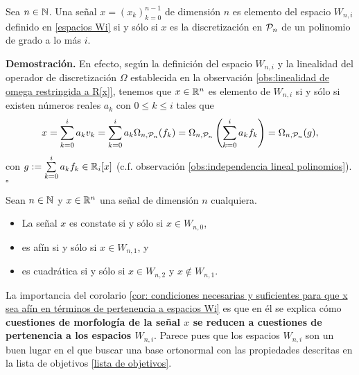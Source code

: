 \begin{prop} \label{obs: s en Wi sii es la discretizacion en malla Pn de un pol de grado a lo más i}
Sea $n \in \mathbb{N}$.
Una señal $x=(x_{k})_{k=0}^{n-1}$ de dimensión $n$
es elemento del espacio $W_{n,i}$ 
definido en \eqref{espacios Wi}
si y sólo si 
$x$ es la discretización en $\mathcal{P}_{n}$
de un polinomio de grado a lo más $i$.
\end{prop}
\noindent
\textbf{Demostración.}
En efecto, según la definición del espacio
$W_{n,i}$ y la linealidad del operador
de discretización 
$\Omega$ establecida en 
la observación
\ref{obs:linealidad de omega restringida a R[x]}, 
tenemos que $x \in \mathbb{R}^{n}$ es elemento de 
$W_{n,i}$ si y sólo si existen números reales
$a_{k}$ con $0 \leq k \leq i$ tales que
\begin{align*}
x=  \sum\limits_{k=0}^{i}a_{k}v_{k} 
=  \sum\limits_{k=0}^{i}a_{k}\Omega_{n, \mathcal{P}_{n}}(f_{k})
=  \Omega_{n, \mathcal{P}_{n}} \left( 
\sum\limits_{k=0}^{i}a_{k}f_{k} \right)
=  \Omega_{n, \mathcal{P}_{n}} (g),
\end{align*}
con $g := \sum\limits_{k=0}^{i}a_{k}f_{k} \in \mathbb{R}_{i}[x]$
(c.f. observación 
\ref{obs:independencia lineal polinomios}).
\null\nobreak\hfill\ensuremath{\square} %


\begin{cor} \label{cor: condiciones necesarias y suficientes para que x sea afín en términos de pertenencia a espacios Wi}
Sean $n \in \mathbb{N}$ y $x \in \mathbb{R}^{n}$ una señal de dimensión
$n$ cualquiera.
\begin{itemize}
\item La señal $x$ es constate si y sólo si $x \in W_{n,0}$,

\item es afín si y sólo si $x \in W_{n,1}$, y 

\item es cuadrática si y sólo si $x \in W_{n,2}$
y $x \not\in W_{n,1}$. 
\end{itemize}
\end{cor}
\noindent
La importancia del corolario
\ref{cor: condiciones necesarias y suficientes para que x sea afín en términos de pertenencia a espacios Wi}
es que en él se explica cómo
\textbf{cuestiones de morfología de la señal $x$
se reducen a cuestiones de pertenencia a los espacios $W_{n,i}$}.
Parece pues que los espacios $W_{n,i}$ son un buen lugar
en el que buscar una base ortonormal con las propiedades
descritas en la lista 
de objetivos \ref{lista de objetivos}.

